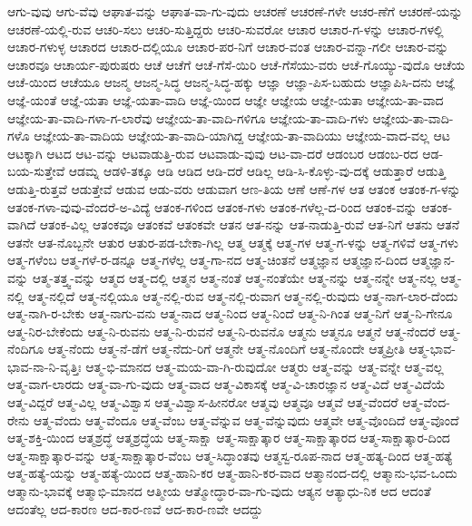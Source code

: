 {ಆಗು-ವುವು
ಆಗು-ವೆವು
ಆಘಾತ-ವನ್ನು
ಆಘಾತ-ವಾ-ಗು-ವುದು
ಆಚರಣೆ
ಆಚರಣೆ-ಗಳೇ
ಆಚರ-ಣೆಗೆ
ಆಚರಣೆ-ಯನ್ನು
ಆಚರಣೆ-ಯಲ್ಲಿ-ರುವ
ಆಚರಿ-ಸಲು
ಆಚರಿ-ಸುತ್ತಿದ್ದರು
ಆಚರಿ-ಸುವರೋ
ಆಚಾರ
ಆಚಾರ-ಗ-ಳನ್ನು
ಆಚಾರ-ಗಳಲ್ಲಿ
ಆಚಾರ-ಗಳುಳ್ಳ
ಆಚಾರದ
ಆಚಾರ-ದಲ್ಲಿಯೂ
ಆಚಾರ-ಪರ-ನಿಗೆ
ಆಚಾರ-ವಂತ
ಆಚಾರ-ವನ್ನಾ-ಗಲೀ
ಆಚಾರ-ವನ್ನು
ಆಚಾರವೂ
ಆಚಾರ್ಯ-ಪುರುಷರು
ಆಚೆ
ಆಚೆಗೆ
ಆಚೆ-ಗೆಸೆ-ಯಿರಿ
ಆಚೆ-ಗೆಸೆಯು-ವರು
ಆಚೆ-ಗೊಯ್ಯು-ವುದೊ
ಆಚೆಯ
ಆಚೆ-ಯಿಂದ
ಆಚೆಯೂ
ಆಜನ್ಮ
ಆಜನ್ಮ-ಸಿದ್ಧ
ಆಜನ್ಮ-ಸಿದ್ಧ-ಹಕ್ಕು
ಆಜ್ಞಾ
ಆಜ್ಞಾ-ಪಿಸ-ಬಹುದು
ಆಜ್ಞಾಪಿಸಿ-ದನು
ಆಜ್ಞೆ
ಆಜ್ಞೆ-ಯಂತೆ
ಆಜ್ಞೆ-ಯತಾ
ಆಜ್ಞೆ-ಯತಾ-ವಾದಿ
ಆಜ್ಞೆ-ಯಿಂದ
ಆಜ್ಞೇ
ಆಜ್ಞೇಯ
ಆಜ್ಞೇ-ಯತಾ
ಆಜ್ಞೇಯ-ತಾ-ವಾದ
ಆಜ್ಞೇಯ-ತಾ-ವಾದಿ-ಗಳಾ-ಗ-ಲಾರೆವು
ಆಜ್ಞೇಯ-ತಾ-ವಾದಿ-ಗಳಿಗೂ
ಆಜ್ಞೇಯ-ತಾ-ವಾದಿ-ಗಳು
ಆಜ್ಞೇಯ-ತಾ-ವಾದಿ-ಗಳೊ
ಆಜ್ಞೇಯ-ತಾ-ವಾದಿಯ
ಆಜ್ಞೇಯ-ತಾ-ವಾದಿ-ಯಾಗಿದ್ದ
ಆಜ್ಞೇಯ-ತಾ-ವಾದಿಯು
ಆಜ್ಞೇಯ-ವಾದ-ವಲ್ಲ
ಆಟ
ಆಟಕ್ಕಾಗಿ
ಆಟದ
ಆಟ-ವನ್ನು
ಆಟವಾಡುತ್ತಿ-ರುವ
ಆಟವಾಡು-ವುವು
ಆಟ-ವಾ-ದರೆ
ಆಡಂಬರ
ಆಡಂಬ-ರದ
ಆಡ-ಬಯ-ಸುತ್ತೇವೆ
ಆಡಮ್ನ
ಆಡಳಿ-ತಕ್ಕೂ
ಆಡಿ
ಆಡಿದ
ಆಡಿ-ದರೆ
ಆಡಿಲ್ಲ
ಆಡಿ-ಸಿ-ಕೊಳ್ಳು-ವು-ದಕ್ಕೆ
ಆಡುತ್ತಾರೆ
ಆಡುತ್ತಿ
ಆಡುತ್ತಿ-ರುತ್ತವೆ
ಆಡುತ್ತೇವೆ
ಆಡುವ
ಆಡು-ವರು
ಆಡುವಾಗ
ಆಣ-ತಿಯ
ಆಣೆ
ಆಣೆ-ಗಳ
ಆತ
ಆತಂಕ
ಆತಂಕ-ಗ-ಳನ್ನು
ಆತಂಕ-ಗಳಾ-ವುವು-ವೆಂದರೆ-ಅ-ವಿದ್ಯೆ
ಆತಂಕ-ಗಳಿಂದ
ಆತಂಕ-ಗಳು
ಆತಂಕ-ಗಳೆಲ್ಲ-ದ-ರಿಂದ
ಆತಂಕ-ವನ್ನು
ಆತಂಕ-ವಾಗಿದೆ
ಆತಂಕ-ವಿಲ್ಲ
ಆತಂಕವೂ
ಆತಂಕವೆ
ಆತಂಕವೇ
ಆತನ
ಆತ-ನನ್ನು
ಆತ-ನಾಡುತ್ತಿ-ರುವೆ
ಆತ-ನಿಗೆ
ಆತನು
ಆತನೆ
ಆತನೇ
ಆತ-ನೊಬ್ಬನೇ
ಆತುರ
ಆತುರ-ಪಡ-ಬೇಕಾ-ಗಿಲ್ಲ
ಆತ್ಮ
ಆತ್ಮಕ್ಕೆ
ಆತ್ಮ-ಗಳ
ಆತ್ಮ-ಗ-ಳನ್ನು
ಆತ್ಮ-ಗಳಿವೆ
ಆತ್ಮ-ಗಳು
ಆತ್ಮ-ಗಳೆಂಬ
ಆತ್ಮ-ಗಳೆ-ರ-ಡನ್ನೂ
ಆತ್ಮ-ಗಳೆಲ್ಲ
ಆತ್ಮ-ಗಾ-ನದ
ಆತ್ಮ-ಚಿಂತನೆ
ಆತ್ಮಜ್ಞಾನ
ಆತ್ಮಜ್ಞಾನ-ದಿಂದ
ಆತ್ಮಜ್ಞಾನ-ವನ್ನು
ಆತ್ಮ-ತತ್ತ್ವ-ವನ್ನು
ಆತ್ಮದ
ಆತ್ಮ-ದಲ್ಲಿ
ಆತ್ಮನ
ಆತ್ಮ-ನಂತೆ
ಆತ್ಮ-ನಂತೆಯೇ
ಆತ್ಮ-ನನ್ನು
ಆತ್ಮ-ನನ್ನೇ
ಆತ್ಮ-ನಲ್ಲ
ಆತ್ಮ-ನಲ್ಲಿ
ಆತ್ಮ-ನಲ್ಲಿದೆ
ಆತ್ಮ-ನಲ್ಲಿಯೂ
ಆತ್ಮ-ನಲ್ಲಿ-ರುವ
ಆತ್ಮ-ನಲ್ಲಿ-ರುವಾಗ
ಆತ್ಮ-ನಲ್ಲಿ-ರುವುದು
ಆತ್ಮ-ನಾಗ-ಲಾರ-ದೆಂದು
ಆತ್ಮ-ನಾಗಿ-ರ-ಬೇಕು
ಆತ್ಮ-ನಾಗು-ವನು
ಆತ್ಮ-ನಾದ
ಆತ್ಮ-ನಿಂದ
ಆತ್ಮ-ನಿಂದೆ
ಆತ್ಮ-ನಿ-ಗಿಂತ
ಆತ್ಮ-ನಿಗೆ
ಆತ್ಮ-ನಿ-ಗೇನೂ
ಆತ್ಮ-ನಿರ-ಬೇಕೆಂದು
ಆತ್ಮ-ನಿ-ರುವನು
ಆತ್ಮ-ನಿ-ರುವನೆ
ಆತ್ಮ-ನಿ-ರುವನೊ
ಆತ್ಮನು
ಆತ್ಮನೂ
ಆತ್ಮನೆ
ಆತ್ಮ-ನೆಂದರೆ
ಆತ್ಮ-ನೆಂದಿಗೂ
ಆತ್ಮ-ನೆಂದು
ಆತ್ಮ-ನೆ-ಡೆಗೆ
ಆತ್ಮ-ನೆದು-ರಿಗೆ
ಆತ್ಮನೇ
ಆತ್ಮ-ನೊಂದಿಗೆ
ಆತ್ಮ-ನೊಂದೇ
ಆತ್ಮಪ್ರೀತಿ
ಆತ್ಮ-ಭಾವ-ಭಾವ-ನಾ-ನಿ-ವೃತ್ತಿಃ
ಆತ್ಮ-ಭಿ-ಮಾನದ
ಆತ್ಮ-ಮಯ-ವಾ-ಗಿ-ರುವುದೋ
ಆತ್ಮರು
ಆತ್ಮ-ವನ್ನು
ಆತ್ಮ-ವನ್ನೇ
ಆತ್ಮ-ವಲ್ಲ
ಆತ್ಮ-ವಾಗ-ಲಾರದು
ಆತ್ಮ-ವಾ-ಗು-ವುದು
ಆತ್ಮ-ವಾದ
ಆತ್ಮ-ವಿಕಾಸಕ್ಕೆ
ಆತ್ಮ-ವಿ-ಚಾರಜ್ಞಾನ
ಆತ್ಮ-ವಿದೆ
ಆತ್ಮ-ವಿದೆಯೆ
ಆತ್ಮ-ವಿದ್ದರೆ
ಆತ್ಮ-ವಿಲ್ಲ
ಆತ್ಮ-ವಿಶ್ವಾಸ
ಆತ್ಮ-ವಿಶ್ವಾಸ-ಹೀನರೋ
ಆತ್ಮವು
ಆತ್ಮವೂ
ಆತ್ಮವೆ
ಆತ್ಮ-ವೆಂದರೆ
ಆತ್ಮ-ವೆಂದ-ರೇನು
ಆತ್ಮ-ವೆಂದು
ಆತ್ಮ-ವೆಂದೂ
ಆತ್ಮ-ವೆಂಬ
ಆತ್ಮ-ವೆನ್ನುವ
ಆತ್ಮ-ವೆನ್ನುವುದು
ಆತ್ಮವೇ
ಆತ್ಮ-ವೊಂದಿದೆ
ಆತ್ಮ-ವೊಂದೆ
ಆತ್ಮ-ಶಕ್ತಿ-ಯಿಂದ
ಆತ್ಮಶ್ರದ್ಧೆ
ಆತ್ಮಶ್ರದ್ಧೆಯ
ಆತ್ಮ-ಸಾಕ್ಷಾ
ಆತ್ಮ-ಸಾಕ್ಷಾತ್ಕಾರ
ಆತ್ಮ-ಸಾಕ್ಷಾತ್ಕಾರದ
ಆತ್ಮ-ಸಾಕ್ಷಾತ್ಕಾರ-ದಿಂದ
ಆತ್ಮ-ಸಾಕ್ಷಾತ್ಕಾರ-ವನ್ನು
ಆತ್ಮ-ಸಾಕ್ಷಾತ್ಕಾರ-ವೆಂಬ
ಆತ್ಮ-ಸಿದ್ಧಾಂತವು
ಆತ್ಮಸ್ವ-ರೂಪ-ನಾದ
ಆತ್ಮ-ಹತ್ಯ-ದಿಂದ
ಆತ್ಮ-ಹತ್ಯೆ
ಆತ್ಮ-ಹತ್ಯೆ-ಯನ್ನು
ಆತ್ಮ-ಹತ್ಯೆ-ಯಿಂದ
ಆತ್ಮ-ಹಾನಿ-ಕರ
ಆತ್ಮ-ಹಾನಿ-ಕರ-ವಾದ
ಆತ್ಮಾನಂದ-ದಲ್ಲಿ
ಆತ್ಮಾನು-ಭವ-ಒಂದು
ಆತ್ಮಾನು-ಭಾವಕ್ಕೆ
ಆತ್ಮಾಭಿ-ಮಾನದ
ಆತ್ಮೀಯ
ಆತ್ಮೋದ್ಧಾರ-ವಾ-ಗು-ವುದು
ಆತ್ಯನ
ಆತ್ಯಾಧು-ನಿಕ
ಆದ
ಆದಂತೆ
ಆದಂತೆಲ್ಲ
ಆದ-ಕಾರಣ
ಆದ-ಕಾರ-ಣವೆ
ಆದ-ಕಾರ-ಣವೇ
ಆದದ್ದು
}
